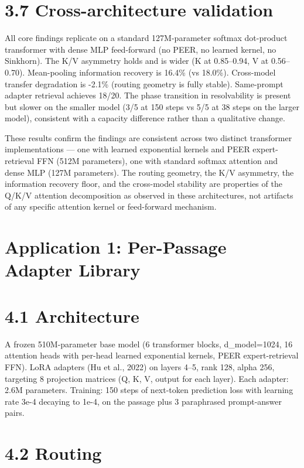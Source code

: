 \section{3.7 Cross-architecture validation}\label{cross-architecture-validation}

All core findings replicate on a standard 127M-parameter softmax dot-product transformer with dense MLP feed-forward (no PEER, no learned kernel, no Sinkhorn). The K/V asymmetry holds and is wider (K at 0.85--0.94, V at 0.56--0.70). Mean-pooling information recovery is 16.4\% (vs 18.0\%). Cross-model transfer degradation is -2.1\% (routing geometry is fully stable). Same-prompt adapter retrieval achieves 18/20. The phase transition in resolvability is present but slower on the smaller model (3/5 at 150 steps vs 5/5 at 38 steps on the larger model), consistent with a capacity difference rather than a qualitative change.

These results confirm the findings are consistent across two distinct transformer implementations --- one with learned exponential kernels and PEER expert-retrieval FFN (512M parameters), one with standard softmax attention and dense MLP (127M parameters). The routing geometry, the K/V asymmetry, the information recovery floor, and the cross-model stability are properties of the Q/K/V attention decomposition as observed in these architectures, not artifacts of any specific attention kernel or feed-forward mechanism.

\section{Application 1: Per-Passage Adapter Library}\label{application-1-per-passage-adapter-library}

\section{4.1 Architecture}\label{architecture}

A frozen 510M-parameter base model (6 transformer blocks, d\_model=1024, 16 attention heads with per-head learned exponential kernels, PEER expert-retrieval FFN). LoRA adapters (Hu et al., 2022) on layers 4--5, rank 128, alpha 256, targeting 8 projection matrices (Q, K, V, output for each layer). Each adapter: 2.6M parameters. Training: 150 steps of next-token prediction loss with learning rate 3e-4 decaying to 1e-4, on the passage plus 3 paraphrased prompt-answer pairs.

\section{4.2 Routing}\label{routing}

